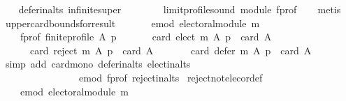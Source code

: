 \begin{isabellebody}
%
\isadelimproof
\ \ %
\endisadelimproof
%
\isatagproof
{}\isamarkupfalse%
\ defer{\isacharunderscore}{\kern0pt}in{\isacharunderscore}{\kern0pt}alts\ infinite{\isacharunderscore}{\kern0pt}super\isanewline
\ \ \ \ \ \ \ \ limit{\isacharunderscore}{\kern0pt}profile{\isacharunderscore}{\kern0pt}sound\ module\ f{\isacharunderscore}{\kern0pt}prof\isanewline
\ \ \isamarkupfalse%
\ metis%
\endisatagproof
{\isafoldproof}%
%
\isadelimproof
\isanewline
%
\endisadelimproof
\isanewline
\isanewline
{}\isamarkupfalse%
\ upper{\isacharunderscore}{\kern0pt}card{\isacharunderscore}{\kern0pt}bounds{\isacharunderscore}{\kern0pt}for{\isacharunderscore}{\kern0pt}result{\isacharcolon}{\kern0pt}\isanewline
\ \ \isanewline
\ \ \ \ e{\isacharunderscore}{\kern0pt}mod{\isacharcolon}{\kern0pt}\ {\isachardoublequoteopen}electoral{\isacharunderscore}{\kern0pt}module\ m{\isachardoublequoteclose}\ \isanewline
\ \ \ \ f{\isacharunderscore}{\kern0pt}prof{\isacharcolon}{\kern0pt}\ {\isachardoublequoteopen}finite{\isacharunderscore}{\kern0pt}profile\ A\ p{\isachardoublequoteclose}\isanewline
\ \ \isanewline
\ \ \ \ {\isachardoublequoteopen}card\ {\isacharparenleft}{\kern0pt}elect\ m\ A\ p{\isacharparenright}{\kern0pt}\ {\isasymle}\ card\ A\ {\isasymand}\isanewline
\ \ \ \ \ \ card\ {\isacharparenleft}{\kern0pt}reject\ m\ A\ p{\isacharparenright}{\kern0pt}\ {\isasymle}\ card\ A\ {\isasymand}\isanewline
\ \ \ \ \ \ card\ {\isacharparenleft}{\kern0pt}defer\ m\ A\ p{\isacharparenright}{\kern0pt}\ {\isasymle}\ card\ A\ {\isachardoublequoteclose}\isanewline
%
\isadelimproof
\ \ %
\endisadelimproof
%
\isatagproof
{}\isamarkupfalse%
\ {\isacharparenleft}{\kern0pt}simp\ add{\isacharcolon}{\kern0pt}\ card{\isacharunderscore}{\kern0pt}mono\ defer{\isacharunderscore}{\kern0pt}in{\isacharunderscore}{\kern0pt}alts\ elect{\isacharunderscore}{\kern0pt}in{\isacharunderscore}{\kern0pt}alts\isanewline
\ \ \ \ \ \ \ \ \ \ \ \ \ \ \ \ e{\isacharunderscore}{\kern0pt}mod\ f{\isacharunderscore}{\kern0pt}prof\ reject{\isacharunderscore}{\kern0pt}in{\isacharunderscore}{\kern0pt}alts{\isacharparenright}{\kern0pt}%
\endisatagproof
{\isafoldproof}%
%
\isadelimproof
\isanewline
%
\endisadelimproof
\isanewline
{}\isamarkupfalse%
\ reject{\isacharunderscore}{\kern0pt}not{\isacharunderscore}{\kern0pt}elec{\isacharunderscore}{\kern0pt}or{\isacharunderscore}{\kern0pt}def{\isacharcolon}{\kern0pt}\isanewline
\ \ \isanewline
\ \ \ \ e{\isacharunderscore}{\kern0pt}mod{\isacharcolon}{\kern0pt}\ {\isachardoublequoteopen}electoral{\isacharunderscore}{\kern0pt}module\ m{\isachardoublequoteclose}\ \isanewline

\end{isabellebody}
